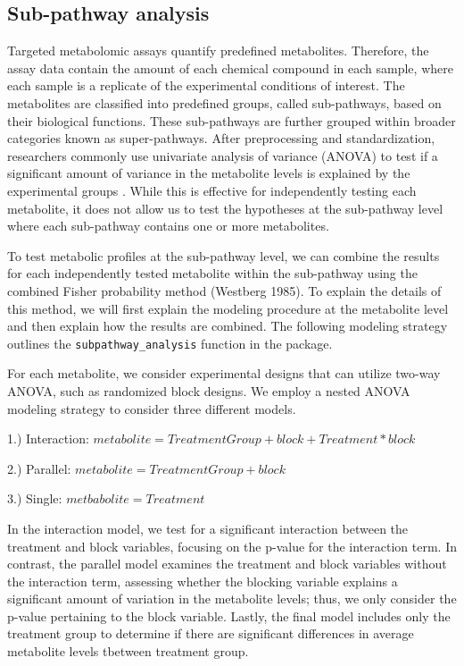\subsection{Sub-pathway analysis}\label{sub-pathway-analysis}

Targeted metabolomic assays quantify predefined metabolites. Therefore, the assay data contain the amount of each chemical compound in each sample, where each sample is a replicate of the experimental conditions of interest. The metabolites are classified into predefined groups, called sub-pathways, based on their biological functions. These sub-pathways are further grouped within broader categories known as super-pathways. After preprocessing and standardization, researchers commonly use univariate analysis of variance (ANOVA) to test if a significant amount of variance in the metabolite levels is explained by the experimental groups . While this is effective for independently testing each metabolite, it does not allow us to test the hypotheses at the sub-pathway level where each sub-pathway contains one or more metabolites.

To test metabolic profiles at the sub-pathway level, we can combine the results for each independently tested metabolite within the sub-pathway using the combined Fisher probability method (Westberg 1985). To explain the details of this method, we will first explain the modeling procedure at the metabolite level and then explain how the results are combined. The following modeling strategy outlines the \texttt{subpathway\_analysis} function in the  package.

For each metabolite, we consider experimental designs that can utilize two-way ANOVA, such as randomized block designs. We employ a nested ANOVA modeling strategy to consider three different models.

1.) Interaction: \(metabolite = Treatment Group + block + Treatment*block\)

2.) Parallel: \(metabolite = Treatment Group + block\)

3.) Single: \(metbabolite= Treatment\)

In the interaction model, we test for a significant interaction between the treatment and block variables, focusing on the p-value for the interaction term. In contrast, the parallel model examines the treatment and block variables without the interaction term, assessing whether the blocking variable explains a significant amount of variation in the metabolite levels; thus, we only consider the p-value pertaining to the block variable. Lastly, the final model includes only the treatment group to determine if there are significant differences in average metabolite levels tbetween treatment group.

